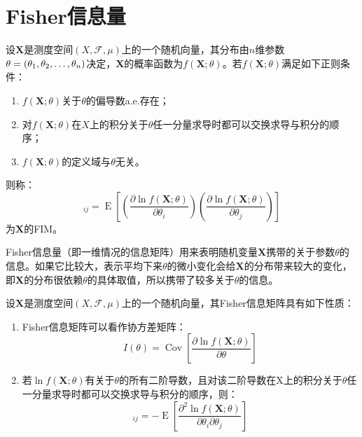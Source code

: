 \section{Fisher信息量}

\begin{definition}
	设$\mathbf{X}$是测度空间$(X,\mathcal{F},\mu)$上的一个随机向量，其分布由$n$维参数$\theta=(\theta_1, \theta_2, \dots, \theta_{n})$决定，$\mathbf{X}$的概率函数为$f(\mathbf{X};\theta)$。若$f(\mathbf{X};\theta)$满足如下正则条件：
	\begin{enumerate}
		\item $f(\mathbf{X};\theta)$关于$\theta$的偏导数a.e.存在；
		\item 对$f(\mathbf{X};\theta)$在$X$上的积分关于$\theta$任一分量求导时都可以交换求导与积分的顺序；
		\item $f(\mathbf{X};\theta)$的定义域与$\theta$无关。
	\end{enumerate}
	则称：
	\begin{equation*}
		[I(\theta)]_{ij}=\operatorname{E}\left[\left(\frac{\partial\ln f(\mathbf{X};\theta)}{\partial\theta_i}\right)\left(\frac{\partial\ln f(\mathbf{X};\theta)}{\partial\theta_j}\right)\right]
	\end{equation*}
	为$\mathbf{X}$的\gls{FIM}。
\end{definition}
\begin{note}
	Fisher信息量（即一维情况的信息矩阵）用来表明随机变量$\mathbf{X}$携带的关于参数$\theta$的信息。如果它比较大，表示平均下来$\theta$的微小变化会给$\mathbf{X}$的分布带来较大的变化，即$\mathbf{X}$的分布很依赖$\theta$的具体取值，所以携带了较多关于$\theta$的信息。
\end{note}
\begin{property}\label{prop:FIM}
	设$\mathbf{X}$是测度空间$(X,\mathcal{F},\mu)$上的一个随机向量，其Fisher信息矩阵具有如下性质：
	\begin{enumerate}
		\item Fisher信息矩阵可以看作协方差矩阵：
		\begin{equation*}
			I(\theta)=\operatorname{Cov}\left[\frac{\partial\ln f(\mathbf{X};\theta)}{\partial\theta}\right]
		\end{equation*}
		\item 若$\ln f(\mathbf{X};\theta)$有关于$\theta$的所有二阶导数，且对该二阶导数在X上的积分关于$\theta$任一分量求导时都可以交换求导与积分的顺序，则：
		\begin{equation*}
			[I(\theta)]_{ij}=-\operatorname{E}\left[\frac{\partial^2\ln f(\mathbf{X};\theta)}{\partial\theta_i\partial\theta_j}\right]
		\end{equation*}
	\end{enumerate}
\end{property}
